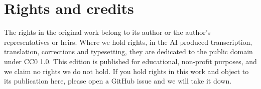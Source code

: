 \documentclass[11pt,a4paper]{article}
\newcounter{appnote}
\begin{document}
\section*{Rights and credits}
The rights in the original work belong to its author or the author's representatives or heirs. Where we hold rights, in the AI-produced transcription, translation, corrections and typesetting, they are dedicated to the public domain under CC0 1.0. This edition is published for educational, non-profit purposes, and we claim no rights we do not hold. If you hold rights in this work and object to its publication here, please open a GitHub issue and we will take it down.

\clearpage


\end{document}
